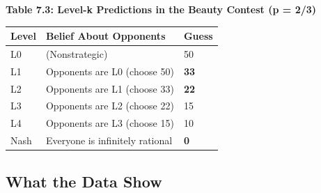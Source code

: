 \documentclass[12pt, letterpaper]{article}
\begin{document}
\textbf{Table 7.3: Level-k Predictions in the Beauty Contest (p = 2/3)}


\begin{table}[H]
\centering
\small
\begin{tabularx}{\linewidth}{lYY}
\toprule
Level & Belief About Opponents & Guess \\
\midrule
L0 & (Nonstrategic) & 50 \\
L1 & Opponents are L0 (choose 50) & \textbf{33} \\
L2 & Opponents are L1 (choose 33) & \textbf{22} \\
L3 & Opponents are L2 (choose 22) & 15 \\
L4 & Opponents are L3 (choose 15) & 10 \\
Nash & Everyone is infinitely rational & \textbf{0} \\
\bottomrule
\end{tabularx}
\end{table}
\newpage


\subsection{What the Data Show}
\end{document}
